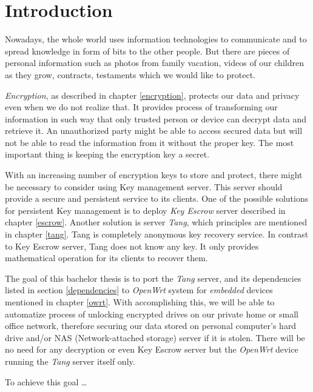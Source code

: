 

%

\chapter{Introduction}\label{introduction}

Nowadays, the whole world uses information technologies to communicate and to spread knowledge in form of bits to the other people.
But there are pieces of personal information such as photos from family vacation, videos of our children as they grow, contracts, testaments which we would like to protect.

{\it Encryption}, as described in chapter \ref{encryption}, protects our data and privacy even when we do not realize that.
It provides process of transforming our information in such way that only trusted person or device can decrypt data and retrieve it.
An unauthorized party might be able to access secured data but will not be able to read the information from it without the proper key.
The most important thing is keeping the encryption key a secret.

With an increasing number of encryption keys to store and protect, there might be necessary to consider using Key management server.
This server should provide a secure and persistent service to its clients. 
One of the possible solutions for persistent Key management is to deploy {\it Key Escrow} server described in chapter \ref{escrow}. 
Another solution is server {\it Tang}, which principles are mentioned in chapter \ref{tang}. 
Tang is completely anonymous key recovery service. 
In contrast to Key Escrow server, Tang does not know any key.
It only provides mathematical operation for its clients to recover them. 

The goal of this bachelor thesis is to port the {\it Tang} server, and its dependencies listed in section \ref{dependencies} to {\it OpenWrt} system for {\it embedded} devices mentioned in chapter \ref{owrt}.
With accomplishing this, we will be able to automatize process of unlocking encrypted drives on our private home or small office network, therefore securing our data stored on personal computer's hard drive and/or NAS (Network-attached storage) server if it is stolen.
There will be no need for any decryption or even Key Escrow server but the {\it OpenWrt} device running the {\it Tang} server itself only.

To achieve this goal \dots 

%

